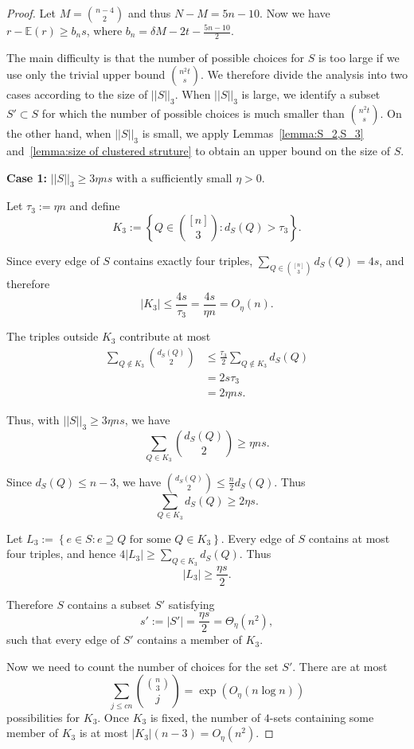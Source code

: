 \documentclass[reqno,11pt]{amsart}
\renewcommand{\leq}{\leqslant}
\renewcommand{\geq}{\geqslant}
\begin{document}
\begin{proof}
Let $M=\binom{n-4}{2}$ and thus $N-M=5n-10$. Now we have $r-\mathbb{E}(r) \geq b_ns$, where $b_n=\delta M-2t-\frac{5n-10}{2}$. 

The main difficulty is that the number of possible choices for $S$ is too large if we use only the trivial upper bound $\binom{n^2t}{s}$. We therefore divide the analysis into two cases according to the size of $||S||_3$. When $||S||_3$ is large, we identify a subset $S'\subset S$ for which the number of possible choices is much smaller than $\binom{n^2t}{s}$. On the other hand, when $||S||_3$ is small, we apply Lemmas~\ref{lemma:S_2,S_3} and~\ref{lemma:size of clustered struture} to obtain an upper bound on the size of $S$.

\textbf{Case 1:} $||S||_3 \geq 3\eta ns$ with a sufficiently small $\eta >0.$ 

Let $\tau_3:=\eta n$ and define
$$
K_3
:=
\left\{
Q\in\binom{[n]}3:
d_S(Q)>\tau_3
\right\}.
$$

Since every edge of \(S\) contains exactly four triples, $\sum_{Q\in\binom{[n]}3}d_S(Q)=4s$, and therefore
$$ |K_3| \leq \frac{4s}{\tau_3}
= \frac{4s}{\eta n}
= O_\eta(n).
$$

The triples outside \(K_3\) contribute at most
$$
\begin{aligned}
\sum_{Q\notin K_3}
\binom{d_S(Q)}2
&\leq
\frac{\tau_3}{2}
\sum_{Q \notin K_3} d_S(Q)\\
&=2s\tau_3\\
&=2\eta ns.
\end{aligned}
$$

Thus, with $||S||_3 \geq 3\eta ns$, we have 
$$
\sum_{Q\in K_3} \binom{d_S(Q)}2 \geq \eta ns.
$$

Since $d_S(Q)\leq n-3$, we have $
\binom{d_S(Q)}2 \leq \frac{n}{2}d_S(Q).
$ Thus
$$
\sum_{Q\in K_3}d_S(Q)
\geq
2\eta s.
$$

Let $ L_3 :=
\left\{ e\in S: e\supseteq Q \text{ for some }Q\in K_3\right\}.$ Every edge of \(S\) contains at most four triples, and hence $ 4|L_3|
\geq \sum_{Q\in K_3}d_S(Q).$ Thus $$
|L_3|
\geq
\frac{\eta s}{2}.
$$

Therefore \(S\) contains a subset \(S'\) satisfying
$$
s':=|S'|
=\frac{\eta s}{2}
=
\Theta_\eta(n^2),
$$
such that every edge of \(S'\) contains a member of \(K_3\).

Now we need to count the number of choices for the set $S'$. There are at most
$$
\sum_{j\leq  cn}
\binom{\binom n3}{j}
= \exp(O_\eta(n\log n))
$$
possibilities for \(K_3\). Once \(K_3\) is fixed, the number of \(4\)-sets containing some member of \(K_3\) is at most
$
|K_3|(n-3)=O_\eta(n^2).
$


\end{proof}
\end{document}
